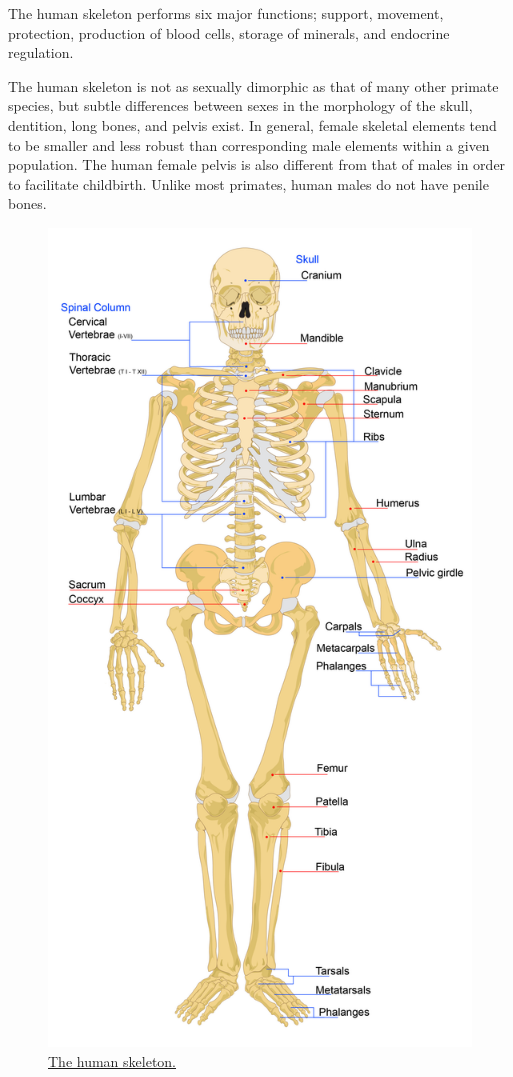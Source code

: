 The human skeleton performs six major functions; support, movement,
protection, production of blood cells, storage of minerals, and
endocrine regulation.

The human skeleton is not as sexually dimorphic as that of many other
primate species, but subtle differences between sexes in the morphology
of the skull, dentition, long bones, and pelvis exist. In general,
female skeletal elements tend to be smaller and less robust than
corresponding male elements within a given population. The human female
pelvis is also different from that of males in order to facilitate
childbirth. Unlike most primates, human males do not have penile bones.

\begin{figure}

{\centering \includegraphics[width=0.7\linewidth]{./figures/anatomy/skeleton}

}

\caption{\href{https://commons.wikimedia.org/wiki/File:Human_skeleton_front_en.svg}{The
human skeleton.}}\label{fig:skeleton}
\end{figure}

